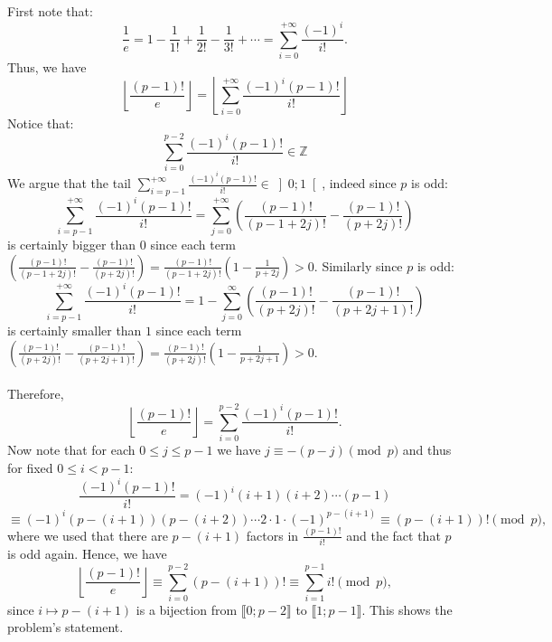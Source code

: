 \begin{solution}
    First note that:
    \[
        \frac{1}{e} = 1 - \frac{1}{1!} + \frac{1}{2!} - \frac{1}{3!} + \cdots = \sum_{i=0}^{+\infty} \frac{\left(-1\right)^i}{i!}.
    \]
    Thus, we have
    \[
        \left\lfloor \frac{\left(p-1\right)!}{e} \right\rfloor = \left\lfloor \sum_{i=0}^{+\infty} \frac{\left(-1\right)^i \left(p-1\right)!}{i!} \right\rfloor
    \]
    Notice that:
    \[
        \sum_{i=0}^{p-2} \frac{\left(-1\right)^i \left(p-1\right)!}{i!}\in\mathbb{Z}
    \]
    We argue that the tail \( \sum_{i=p-1}^{+\infty} \frac{\left(-1\right)^i \left(p-1\right)!}{i!}\in \left]0;1\right[ \), indeed since \( p \) is odd:
    \[
        \sum_{i=p-1}^{+\infty} \frac{\left(-1\right)^i \left(p-1\right)!}{i!}= \sum_{j=0}^{+\infty} \left(\frac{\left(p-1\right)!}{\left(p-1+2j\right)!}-\frac{\left(p-1\right)!}{\left(p+2j\right)!}\right)
    \]
    is certainly bigger than \( 0 \) since each term \( \left(\frac{\left(p-1\right)!}{\left(p-1+2j\right)!}-\frac{\left(p-1\right)!}{\left(p+2j\right)!}\right)=\frac{\left(p-1\right)!}{\left(p-1+2j\right)!}\left(1-\frac{1}{p+2j}\right)>0 \). Similarly since \( p \) is odd:
    \[
        \sum_{i=p-1}^{+\infty} \frac{\left(-1\right)^i \left(p-1\right)!}{i!}=1-\sum_{j=0}^\infty \left(\frac{\left(p-1\right)!}{\left(p+2j\right)!}-\frac{\left(p-1\right)!}{\left(p+2j+1\right)!}\right)
    \]
    is certainly smaller than \( 1 \) since each term \( \left(\frac{\left(p-1\right)!}{\left(p+2j\right)!}-\frac{\left(p-1\right)!}{\left(p+2j+1\right)!}\right)=\frac{\left(p-1\right)!}{\left(p+2j\right)!}\left(1-\frac{1}{p+2j+1}\right)>0 \).
    \\\\
    Therefore,
    \[
        \left\lfloor \frac{\left(p-1\right)!}{e} \right\rfloor = \sum_{i=0}^{p-2} \frac{\left(-1\right)^i \left(p-1\right)!}{i!}.
    \]
    Now note that for each \( 0\leq j\leq p-1 \) we have \( j\equiv -\left(p-j\right)\pmod{p} \) and thus for fixed \( 0\leq i < p-1 \):
    \[
        \frac{\left(-1\right)^i \left(p-1\right)!}{i!} = \left(-1\right)^i
        \left(i+1\right)\left(i+2\right)\cdots\left(p-1\right) \]
    \[
        \equiv \left(-1\right)^i \left(p-\left(i+1\right)\right)\left(p-\left(i+2\right)\right)\cdots 2 \cdot 1 \cdot \left(-1\right)^{p-\left(i+1\right)} \equiv \left(p-\left(i+1\right)\right)! \pmod{p},
    \]
    where we used that there are \( p-\left(i+1\right) \) factors in \( \frac{\left(p-1\right)!}{i!} \) and the fact that \( p \) is odd again. Hence, we have
    \[
        \left\lfloor \frac{\left(p-1\right)!}{e} \right\rfloor \equiv \sum_{i=0}^{p-2} \left(p-\left(i+1\right)\right)! \equiv \sum_{i=1}^{p-1} i! \pmod{p},
    \]
    since \( i\mapsto p-\left(i+1\right) \) is a bijection from \( \llbracket 0;p-2 \rrbracket \) to \( \llbracket 1;p-1 \rrbracket \). This shows the problem's statement.
\end{solution}
